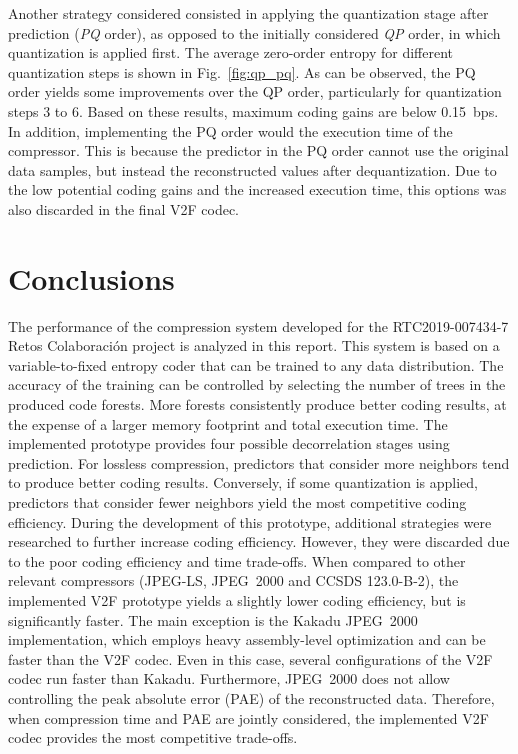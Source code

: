 \documentclass{class/technicalReportUAB}
\begin{document}
Another strategy considered consisted in applying the quantization stage after prediction (\textit{PQ} order), as opposed to the 
initially considered \textit{QP} order, in which quantization is applied first. The average zero-order entropy for different
quantization steps is shown in Fig.~\ref{fig:qp_pq}. As can be observed, the PQ order yields some improvements over the QP order, 
particularly for quantization steps 3 to 6. Based on these results, maximum coding gains are below 0.15~bps. In addition, 
implementing the PQ order would the execution time of the compressor. This is because the predictor in the PQ order cannot use the 
original data samples, but instead the reconstructed values after dequantization. Due to the low potential coding gains and the 
increased execution time, this options was also discarded in the final V2F codec.

\section{Conclusions}\label{sec:conclusions}

The performance of the compression system developed for the RTC2019-007434-7 Retos Colaboración project is analyzed in this report.
% 
This system is based on a variable-to-fixed entropy coder that can be trained to any data distribution. The accuracy of the training
can be controlled by selecting the number of trees in the produced code forests. More forests consistently produce better coding results,
at the expense of a larger memory footprint and total execution time. 
% 
The implemented prototype provides four possible decorrelation stages using prediction. For lossless compression, predictors that 
consider more neighbors tend to produce better coding results. Conversely, if some quantization is applied, predictors that 
consider fewer neighbors yield the most competitive coding efficiency.
% 
During the development of this prototype, additional strategies were researched to further increase coding efficiency. However, 
they were discarded due to the poor coding efficiency and time trade-offs.
% 
When compared to other relevant compressors (JPEG-LS, JPEG~2000 and CCSDS 123.0-B-2), the implemented V2F prototype yields
a slightly lower coding efficiency, but is significantly faster. 
The main exception is the Kakadu JPEG~2000 implementation, which employs heavy assembly-level optimization and can be faster than 
the V2F codec. Even in this case, several configurations of the V2F codec run faster than Kakadu. Furthermore, JPEG~2000 does not 
allow controlling the peak absolute error (PAE) of the reconstructed data. Therefore, when compression time and PAE are jointly 
considered, the implemented V2F codec provides the most competitive trade-offs.
\end{document}
